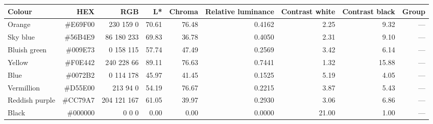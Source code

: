 \begin{tabular}{lrrrrrrrr}
\toprule
Colour & HEX & RGB & L* & Chroma & Relative luminance & Contrast white & Contrast black & Group \\
\midrule
Orange & \#E69F00 & 230 159 0 & 70.61 & 76.48 & 0.4162 & 2.25 & 9.32 & — \\
Sky blue & \#56B4E9 & 86 180 233 & 69.83 & 36.78 & 0.4050 & 2.31 & 9.10 & — \\
Bluish green & \#009E73 & 0 158 115 & 57.74 & 47.49 & 0.2569 & 3.42 & 6.14 & — \\
Yellow & \#F0E442 & 240 228 66 & 89.11 & 76.63 & 0.7441 & 1.32 & 15.88 & — \\
Blue & \#0072B2 & 0 114 178 & 45.97 & 41.45 & 0.1525 & 5.19 & 4.05 & — \\
Vermillion & \#D55E00 & 213 94 0 & 54.19 & 76.67 & 0.2215 & 3.87 & 5.43 & — \\
Reddish purple & \#CC79A7 & 204 121 167 & 61.05 & 39.97 & 0.2930 & 3.06 & 6.86 & — \\
Black & \#000000 & 0 0 0 & 0.00 & 0.00 & 0.0000 & 21.00 & 1.00 & — \\
\bottomrule
\end{tabular}

